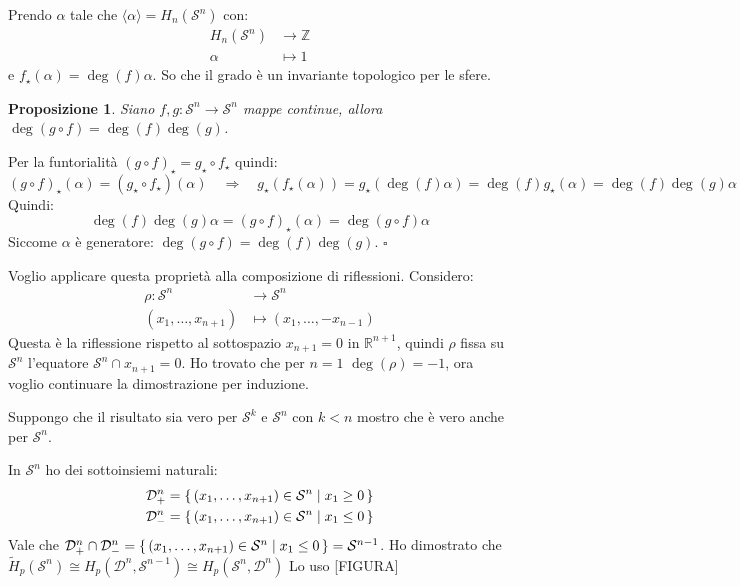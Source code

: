 \documentclass[10pt, twoside=false, x11names]{scrbook}
\newtheorem{proposition}[theorem]{Proposizione}
\newenvironment{proof}{{\textbf{Dimostrazione}:}}{\hfill $\square$}
\newcommand{\Z}{\mathbb{Z}}
\newcommand{\RN}[1][]{\mathbb{R}^#1}
\newcommand{\Sph}[1][]{\mathcal{S}^#1}
\newcommand{\Disk}[1][]{\mathcal{D}^#1}
\begin{document}
Prendo $ \alpha $ tale che $ \langle\alpha\rangle = H_n(\Sph{n}) $ con:
\begin{align*}
  H_n(\Sph{n}) & \to \Z \\
  \alpha & \mapsto 1
\end{align*}
e $ f_\star (\alpha) = \deg{(f)} \alpha $. So che il grado è un invariante topologico per le sfere.

\begin{proposition}
  Siano $ f,g \colon \Sph{n} \to \Sph{n} $ mappe continue, allora $ \deg{(g \circ f)} = \deg{(f)} \deg{(g)} $.
\end{proposition}
\begin{proof}
  Per la funtorialità $ (g \circ f)_\star = g_\star \circ f_\star $ quindi:
  \[
    (g \circ f)_\star (\alpha) = (g_\star \circ f_\star)(\alpha) \quad \Rightarrow \quad g_\star (f_\star (\alpha)) = g_\star(\deg{(f)}\alpha) = \deg{(f)} g_\star(\alpha) = \deg{(f)}\deg{(g)}\alpha
  \]
  Quindi:
  \[
    \deg{(f)}\deg{(g)}\alpha = (g \circ f)_\star (\alpha) = \deg{(g \circ f)} \alpha
  \]
  Siccome $ \alpha $ è generatore: $ \deg{(g \circ f)} = \deg{(f)} \deg{(g)} $.
\end{proof}

Voglio applicare questa proprietà alla composizione di riflessioni.
Considero:
\begin{align*}
  \rho \colon \Sph{n} & \to \Sph{n} \\
  (x_1, \dots, x_{n+1}) & \mapsto (x_1, \dots, - x_{n-1})
\end{align*}
Questa è la riflessione rispetto al sottospazio $ x_{n+1} = 0 $ in $ \RN{n+1} $, quindi
$ \rho $ fissa su $ \Sph{n} $ l'equatore $ \Sph{n} \cap x_{n+1} = 0 $.
Ho trovato che per $ n = 1 $ $ \deg{(\rho)} = -1 $, ora voglio continuare la
dimostrazione per induzione.

Suppongo che il risultato sia vero per $ \Sph{k} $ e $ \Sph{n} $ con $ k < n $
mostro che è vero anche per $ \Sph{n} $.

In $ \Sph{n} $ ho dei sottoinsiemi naturali:
\begin{gather*}
  \Disk{n}_+ = \set{ (x_1, \dots, x_{n+1}) \in \Sph{n} | x_1 \geq 0 } \\
  \Disk{n}_- = \set{ (x_1, \dots, x_{n+1}) \in \Sph{n} | x_1 \leq 0 }
\end{gather*}
Vale che $ \Disk{n}_+ \cap \Disk{n}_- = \set{ (x_1, \dots, x_{n+1}) \in \Sph{n} | x_1 \leq 0 } = \Sph{n-1} $.
Ho dimostrato che $ \tilde{H}_p(\Sph{n}) \cong H_p(\Disk{n}, \Sph{n-1}) \cong H_p(\Sph{n}, \Disk{n}) $
Lo uso
[FIGURA]
\end{document}
